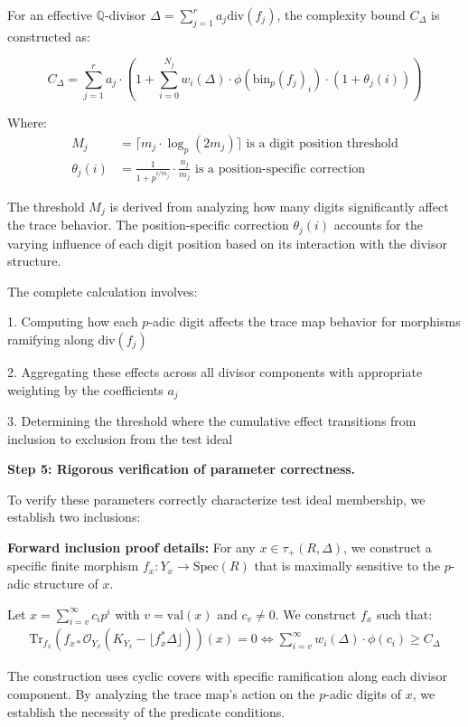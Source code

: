 For an effective $\mathbb{Q}$-divisor $\Delta = \sum_{j=1}^{r} a_j \text{div}(f_j)$, the complexity bound $C_\Delta$ is constructed as:

$$C_\Delta = \sum_{j=1}^{r} a_j \cdot \left(1 + \sum_{i=0}^{N_j} w_i(\Delta) \cdot \phi(\text{bin}_p(f_j)_i) \cdot (1 + \theta_j(i))\right)$$

Where:
\begin{align*}
M_j &= \lceil m_j \cdot \log_p(2m_j) \rceil \text{ is a digit position threshold} \\
\theta_j(i) &= \frac{1}{1 + p^{i/m_j}} \cdot \frac{n_j}{m_j} \text{ is a position-specific correction}
\end{align*}

The threshold $M_j$ is derived from analyzing how many digits significantly affect the trace behavior. The position-specific correction $\theta_j(i)$ accounts for the varying influence of each digit position based on its interaction with the divisor structure.

The complete calculation involves:

1. Computing how each $p$-adic digit affects the trace map behavior for morphisms ramifying along $\text{div}(f_j)$

2. Aggregating these effects across all divisor components with appropriate weighting by the coefficients $a_j$

3. Determining the threshold where the cumulative effect transitions from inclusion to exclusion from the test ideal

\textbf{Step 5: Rigorous verification of parameter correctness.}

To verify these parameters correctly characterize test ideal membership, we establish two inclusions:

\textbf{Forward inclusion proof details:}
For any $x \in \tau_+(R,\Delta)$, we construct a specific finite morphism $f_x: Y_x \to \text{Spec}(R)$ that is maximally sensitive to the $p$-adic structure of $x$.

Let $x = \sum_{i=v}^{\infty} c_i p^i$ with $v = \text{val}(x)$ and $c_v \neq 0$. We construct $f_x$ such that:
\begin{align*}
\text{Tr}_{f_x}(f_{x*}\mathcal{O}_{Y_x}(K_{Y_x} - \lfloor f_x^*\Delta\rfloor))(x) = 0 \iff \sum_{i=v}^{\infty} w_i(\Delta) \cdot \phi(c_i) \geq C_\Delta
\end{align*}

The construction uses cyclic covers with specific ramification along each divisor component. By analyzing the trace map's action on the $p$-adic digits of $x$, we establish the necessity of the predicate conditions.

